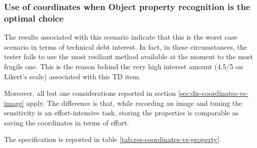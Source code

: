     \subsubsection{Use of coordinates when Object property recognition is the optimal choice}
     \label{sec:disc-rq3-wrong-technique-2}
    The results associated with this scenario indicate that this is the worst case scenario in terms of technical debt interest. In fact, in these circumstances, the tester fails to use the most resiliant method available at the moment to the most fragile one.  This is the reason behind the very high interest amount (4.5/5 on Likert's scale) associated with this TD item.

    Moreover, all but one considerations reported in section \ref{sec:dis-coordinates-vs-image} apply. The difference is that, while recording an image and tuning the sensitivity is an effort-intensive task, storing the properties is comparable as saving the coordinates in terms of effort.

    The specification is reported in table \ref{tab:res-coordinates-vs-property}.

